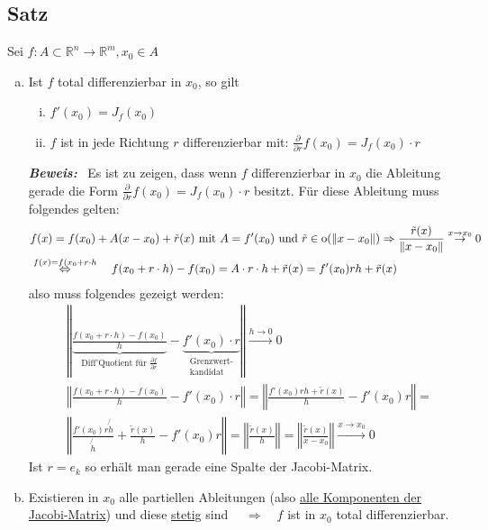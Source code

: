 \documentclass[11pt,a4paper]{book}
\newcommand {\Rn}	{\mathbb{R}^n}
\newcommand {\Rm}	{\mathbb{R}^m}
\newcommand{\1}    	{\mathbbm{1}}
\newcommand{\mitt}	{\textrm{ mit }}
\newcommand{\Beweis}[1][Beweis]
{\begin{mdframed}[backgroundcolor=gray!10,linewidth=0pt]\noindent\textit{\textbf{{#1}:}}~}
\newcommand{\QED}	{\end{mdframed}}
\begin{document}
\subsection{Satz}
Sei \(f : A \subset \Rn \rightarrow \Rm, x_0 \in A\)
\begin{enumerate}[a.~]
	\item Ist \(f\) total differenzierbar in \(x_0\), so gilt
	\begin{enumerate}[(i)]
		\item \(f'(x_0) = J_f(x_0) \)
		\item \(f\) ist in jede Richtung \(r\) differenzierbar mit: \( \frac{\partial}{\partial r} f(x_0) = J_f(x_0) \cdot r \)
	\end{enumerate}
	\Beweis
	Es ist zu zeigen, dass
	wenn \(f\) differenzierbar in \(x_0\) die Ableitung gerade die Form \(\frac{\partial}{\partial r} f(x_0) = J_f(x_0) \cdot r \) besitzt. Für diese Ableitung muss folgendes gelten:
	\begin{align*}
		&f(x) = f(x_0) + A(x-x_0) + \tilde{r}(x) \mitt A = f'(x_0)
		\textrm{ und } \tilde{r} \in \hbox{o}(\Vert x - x_0 \Vert) \Rightarrow \frac{\tilde{r}(x)}{\Vert x - x_0 \Vert} \stackrel{x \rightarrow x_0}{\rightarrow} 0 \\
		&\stackrel{f(x) = f(x_0 + r \cdot h}{\Leftrightarrow} \quad
		f(x_0 + r \cdot h) - f(x_0) = A \cdot r \cdot h + \tilde{r}(x) = f'(x_0) r h + \tilde{r}(x)
	\end{align*}		
	also muss folgendes gezeigt werden:
	\begin{align*}
		&\left\Vert 
		\underbrace{\frac{f(x_0 + r \cdot h) - f(x_0)}{h}}_{\textrm{Diff'Quotient für }\frac{\partial f}{\partial r}} - 
		\underbrace{f'(x_0)\cdot r}_{\substack{\textrm{Grenzwert-}\\\textrm{kandidat}}} \right\Vert \stackrel{h \rightarrow 0}{\rightarrow} 0 \\
		&\left\Vert \frac{f(x_0 + r \cdot h) - f(x_0)}{h} - f'(x_0) \cdot r \right\Vert =
		\left\Vert
		\frac{f'(x_0) r h + \tilde{r}(x)}{h} - f'(x_0)r
		\right\Vert = \\
		&\left\Vert
		\frac{f'(x_0)r \not{h}}{\not{h}}
		+ \frac{\tilde{r}(x)}{h} - 
		f'(x_0)r
		\right\Vert = 
		\left\Vert \frac{\tilde{r}(x)}{h} \right\Vert =
		\left\Vert \frac{\tilde{r}(x)}{x - x_0} \right\Vert
		\stackrel{x \rightarrow x_0}{\rightarrow} 0
	\end{align*}
	Ist \(r = e_k\) so erhält man gerade eine Spalte der Jacobi-Matrix.
	\QED
	
	\item Existieren in \(x_0\) alle partiellen Ableitungen (also \underline{alle Komponenten der Jacobi-Matrix}) und diese \underline{stetig} sind \(\quad \Rightarrow \quad f\) ist in \(x_0\) total differenzierbar. \\
	

\end{enumerate}
\end{document}
